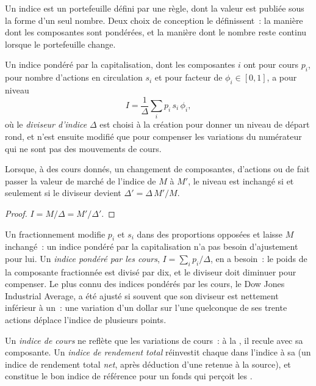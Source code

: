 Un indice est un portefeuille défini par une règle, dont la valeur est publiée sous la forme
d'un seul nombre. Deux choix de conception le définissent~: la manière dont les composantes
sont pondérées, et la manière dont le nombre reste continu lorsque le portefeuille change.

\begin{definition}\label{def:m1:shares-corporate-actions-indices:divisor}
Un indice pondéré par la capitalisation, dont les composantes $i$ ont pour cours $p_i$, pour
nombre d'actions en circulation $s_i$ et pour facteur de  $\phi_i \in [0,1]$, a pour niveau
\[
I = \frac{1}{\Delta}\sum_i p_i\,s_i\,\phi_i ,
\]
où le \emph{diviseur d'indice} $\Delta$ est choisi à la création pour
donner un niveau de départ rond, et n'est ensuite modifié que pour compenser les variations
du numérateur qui ne sont pas des mouvements de cours.
\end{definition}

\begin{proposition}\label{prop:m1:shares-corporate-actions-indices:divisoradj}
Lorsque, à des cours donnés, un changement de composantes, d'actions ou de  fait passer la
valeur de marché de l'indice de $M$ à $M'$, le niveau est inchangé si et seulement si
le diviseur devient $\Delta' = \Delta\,M'/M$.
\end{proposition}
\begin{proof}
$I = M/\Delta = M'/\Delta'$.
\end{proof}

Un fractionnement modifie $p_i$ et $s_i$ dans des proportions opposées et laisse $M$
inchangé~: un indice pondéré par la capitalisation n'a pas besoin d'ajustement pour lui. Un
\emph{indice pondéré par les cours}, $I = \sum_i p_i/\Delta$, en a besoin~:
le poids de la composante fractionnée est divisé par dix, et le diviseur doit diminuer pour
compenser. Le plus connu des indices pondérés par les cours, le Dow Jones Industrial
Average, a été ajusté si souvent que son diviseur est nettement inférieur
à un~: une variation d'un dollar sur l'une quelconque de ses trente actions déplace
l'indice de plusieurs points.

\begin{definition}\label{def:m1:shares-corporate-actions-indices:tri}
Un \emph{indice de cours} ne reflète que les variations de cours~: à la , il recule
avec sa composante. Un \emph{indice de rendement total}
réinvestit chaque  dans l'indice à sa  (un indice de rendement total \emph{net}, après déduction d'une
retenue à la source), et constitue le bon indice de référence pour
un fonds qui perçoit les .
\end{definition}

